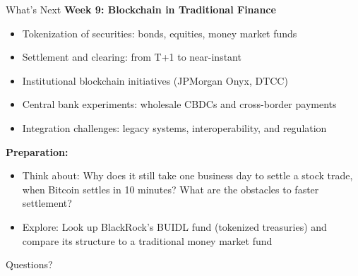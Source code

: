\documentclass[10pt]{beamer}
\begin{document}
\begin{frame}{What's Next}
  \textbf{Week 9: Blockchain in Traditional Finance}
  \begin{itemize}
    \item Tokenization of securities: bonds, equities, money market funds
    \item Settlement and clearing: from T+1 to near-instant
    \item Institutional blockchain initiatives (JPMorgan Onyx, DTCC)
    \item Central bank experiments: wholesale CBDCs and cross-border payments
    \item Integration challenges: legacy systems, interoperability, and regulation
  \end{itemize}
  
  \vspace{1em}
  \textbf{Preparation:}
  \begin{itemize}
    \item Think about: Why does it still take one business day to settle a stock trade, when Bitcoin settles in 10 minutes? What are the obstacles to faster settlement?
    \item Explore: Look up BlackRock's BUIDL fund (tokenized treasuries) and compare its structure to a traditional money market fund
  \end{itemize}
\end{frame}

\begin{frame}[plain]
  \vfill
  \begin{center}
    {\Large Questions?}
  \end{center}
  \vfill
\end{frame}
\end{document}

